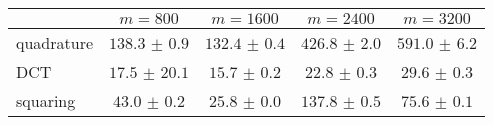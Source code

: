 \centering
\renewcommand{\arraystretch}{1.2}
\begin{tabular}{@{}lcccc@{}}
\toprule
 & $m=800$ & $m=1600$ & $m=2400$ & $m=3200$\\
\midrule
quadrature & $138.3$ $\pm$ $0.9$ & $132.4$ $\pm$ $0.4$ & $426.8$ $\pm$ $2.0$ & $591.0$ $\pm$ $6.2$ \\
DCT & $17.5$ $\pm$ $20.1$ & $15.7$ $\pm$ $0.2$ & $22.8$ $\pm$ $0.3$ & $29.6$ $\pm$ $0.3$ \\
squaring & $43.0$ $\pm$ $0.2$ & $25.8$ $\pm$ $0.0$ & $137.8$ $\pm$ $0.5$ & $75.6$ $\pm$ $0.1$ \\
\bottomrule
\end{tabular}
